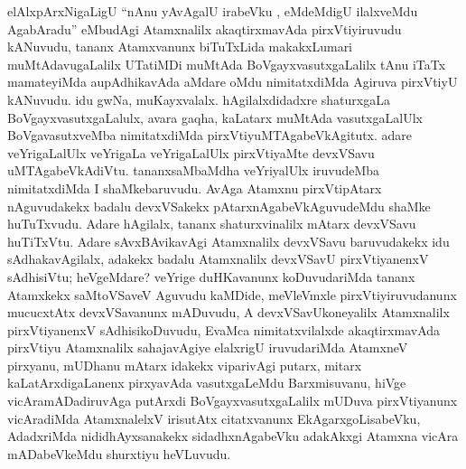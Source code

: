 \centerline{}

\begin{artha}
elAlxpArxNigaLigU ``nAnu yAvAgalU irabeVku , eMdeMdigU ilalxveMdu AgabAradu'' 
eMbudAgi Atamxnalilx akaqtirxmavAda pirxVtiyiruvudu kANuvudu, tananx
Atamxvanunx biTuTxLida makakxLumari muMtAdavugaLalilx UTatiMDi muMtAda
BoVgayxvasutxgaLalilx tAnu iTaTx mamateyiMda aupAdhikavAda aMdare oMdu
nimitatxdiMda Agiruva pirxVtiyU kANuvudu. idu gwNa,
muKayxvalalx. hAgilalxdidadxre shaturxgaLa BoVgayxvasutxgaLalulx, avara
gaqha, kaLatarx muMtAda vasutxgaLalUlx BoVgavasutxveMba nimitatxdiMda
pirxVtiyuMTAgabeVkAgitutx. adare veYrigaLalUlx veYrigaLa veYrigaLalUlx
pirxVtiyaMte devxVSavu uMTAgabeVkAdiVtu. tananxsaMbaMdha veYriyalUlx
iruvudeMba nimitatxdiMda I shaMkebaruvudu. AvAga Atamxnu pirxVtipAtarx
nAguvudakekx badalu devxVSakekx pAtarxnAgabeVkAguvudeMdu shaMke
huTuTxvudu. Adare hAgilalx, tananx shaturxvinalilx mAtarx devxVSavu
huTiTxVtu. Adare sAvxBAvikavAgi Atamxnalilx devxVSavu baruvudakekx idu
sAdhakavAgilalx, adakekx badalu Atamxnalilx devxVSavU pirxVtiyanenxV
sAdhisiVtu; heVgeMdare? veYrige duHKavanunx koDuvudariMda tananx
Atamxkekx saMtoVSaveV Aguvudu kaMDide, meVleVmxle pirxVtiyiruvudanunx
mucucxtAtx devxVSavanunx mADuvudu, A devxVSavUkoneyalilx Atamxnalilx
pirxVtiyanenxV sAdhisikoDuvudu, EvaMca nimitatxvilalxde akaqtirxmavAda
pirxVtiyu Atamxnalilx sahajavAgiye elalxrigU iruvudariMda AtamxneV
pirxyanu, mUDhanu mAtarx idakekx viparivAgi putarx, mitarx
kaLatArxdigaLanenx pirxyavAda vasutxgaLeMdu Barxmisuvanu, hiVge
vicAramADadiruvAga putArxdi BoVgayxvasutxgaLalilx mUDuva pirxVtiyanunx
vicAradiMda AtamxnalelxV irisutAtx citatxvanunx EkAgarxgoLisabeVku,
AdadxriMda nididhAyxsanakekx sidadhxnAgabeVku adakAkxgi Atamxna vicAra mADabeVkeMdu shurxtiyu heVLuvudu.
\end{artha}

